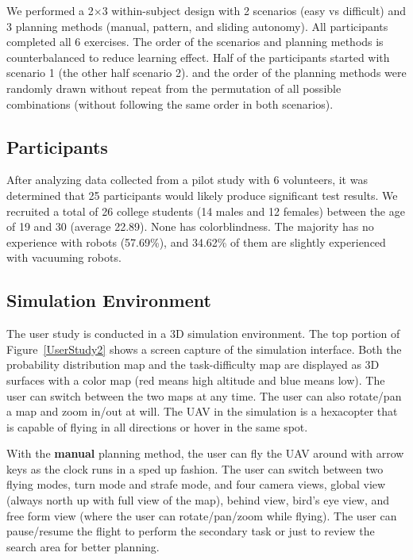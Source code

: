 We performed a 2$\times$3 within-subject design with 2 scenarios (easy vs difficult) and 3 planning methods (manual, pattern, and sliding autonomy). All participants completed all 6 exercises. The order of the scenarios and planning methods is counterbalanced to reduce learning effect. Half of the participants started with scenario 1 (the other half scenario 2). and the order of the planning methods were randomly drawn without repeat from the permutation of all possible combinations (without following the same order in both scenarios).

\subsection{Participants}

After analyzing data collected from a pilot study with 6 volunteers, it was determined that 25 participants would likely produce significant test results. We recruited a total of 26 college students (14 males and 12 females) between the age of 19 and 30 (average 22.89). None has colorblindness. The majority has no experience with robots (57.69\%), and 34.62\% of them are slightly experienced with vacuuming robots.

\subsection{Simulation Environment}

The user study is conducted in a 3D simulation environment. The top portion of Figure~\ref{UserStudy2} shows a screen capture of the simulation interface. Both the probability distribution map and the task-difficulty map are displayed as 3D surfaces with a color map (red means high altitude and blue means low). The user can switch between the two maps at any time. The user can also rotate/pan a map and zoom in/out at will. The UAV in the simulation is a hexacopter that is capable of flying in all directions or hover in the same spot.

With the \textbf{manual} planning method, the user can fly the UAV around with arrow keys as the clock runs in a sped up fashion. The user can switch between two flying modes, turn mode and strafe mode, and four camera views, global view (always north up with full view of the map), behind view, bird's eye view, and free form view (where the user can rotate/pan/zoom while flying). The user can pause/resume the flight to perform the secondary task or just to review the search area for better planning.

